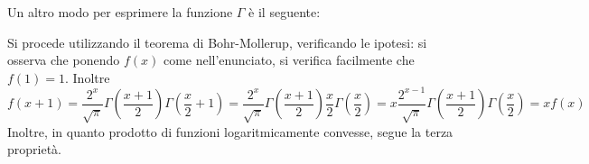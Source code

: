 \documentclass{report}
\begin{document}
Un altro modo per esprimere la funzione $\Gamma$ è il seguente:
\begin{myproof}
Si procede utilizzando il teorema di Bohr-Mollerup, verificando le ipotesi: si osserva che ponendo $f(x)$ come nell'enunciato, si verifica facilmente che $f(1) = 1$. Inoltre
$$
f(x+1) = \frac{2^x}{\sqrt{\pi}}\Gamma \left( \frac{x+1}{2} \right)\Gamma \left( \frac{x}{2} + 1 \right) = \frac{2^x}{\sqrt{\pi}} \Gamma \left( \frac{x+1}{2} \right) \frac{x}{2} \Gamma \left( \frac{x}{2} \right) = x \frac{2^{x-1}}{\sqrt{\pi}} \Gamma \left( \frac{x+1}{2} \right) \Gamma \left( \frac{x}{2} \right) = x f(x)
$$
Inoltre, in quanto prodotto di funzioni logaritmicamente convesse, segue la terza proprietà.
\end{myproof}
\end{document}
